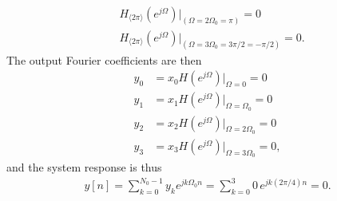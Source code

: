 \documentclass{report}
\begin{document}
\begin{solution}
\begin{align*}
        &H_{\langle 2\pi\rangle}(e^{j\Omega})\bigg|_{(\Omega=2\Omega_0=\pi)} = 0 \\
        &H_{\langle 2\pi\rangle}(e^{j\Omega})\bigg|_{(\Omega=3\Omega_0=3\pi/2=-\pi/2)} = 0.
    \end{align*}
    The output Fourier coefficients are then 
    \begin{align*}
        y_0 &= x_0 H(e^{j\Omega})\big|_{\Omega=0} = 0 \\
        y_1 &= x_1 H(e^{j\Omega})\big|_{\Omega=\Omega_0} = 0 \\
        y_2 &= x_2 H(e^{j\Omega})\big|_{\Omega=2\Omega_0} = 0 \\
        y_3 &= x_3 H(e^{j\Omega})\big|_{\Omega=3\Omega_0} = 0,
    \end{align*}
    and the system response is thus 
    \begin{align*}
        y[n] = \sum_{k=0}^{N_0-1} y_k e^{jk\Omega_0 n} = \sum_{k=0}^{3} 0\,e^{jk (2\pi/4) n} = 0.
    \end{align*}
\end{solution}
\end{document}
